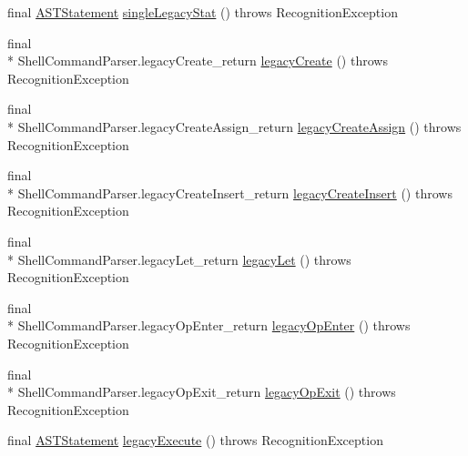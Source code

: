 \begin{DoxyCompactItemize}
\item 
final \hyperlink{classorg_1_1tzi_1_1use_1_1parser_1_1soil_1_1ast_1_1_a_s_t_statement}{A\-S\-T\-Statement} \hyperlink{classorg_1_1tzi_1_1use_1_1parser_1_1shell_1_1_shell_command_parser_a65e8d10fcc4ea150207c26709ffe4c95}{single\-Legacy\-Stat} ()  throws Recognition\-Exception 
\item 
final \\*
Shell\-Command\-Parser.\-legacy\-Create\-\_\-return \hyperlink{classorg_1_1tzi_1_1use_1_1parser_1_1shell_1_1_shell_command_parser_a84a4d3f3692cd30e19e023ea7d5605f6}{legacy\-Create} ()  throws Recognition\-Exception 
\item 
final \\*
Shell\-Command\-Parser.\-legacy\-Create\-Assign\-\_\-return \hyperlink{classorg_1_1tzi_1_1use_1_1parser_1_1shell_1_1_shell_command_parser_a4e6e4af3b8771a6697064099bbb9c935}{legacy\-Create\-Assign} ()  throws Recognition\-Exception 
\item 
final \\*
Shell\-Command\-Parser.\-legacy\-Create\-Insert\-\_\-return \hyperlink{classorg_1_1tzi_1_1use_1_1parser_1_1shell_1_1_shell_command_parser_a131c88b0991525525b04d6e87e8f32bd}{legacy\-Create\-Insert} ()  throws Recognition\-Exception 
\item 
final \\*
Shell\-Command\-Parser.\-legacy\-Let\-\_\-return \hyperlink{classorg_1_1tzi_1_1use_1_1parser_1_1shell_1_1_shell_command_parser_afc14307fde7022bf2e6824305033984b}{legacy\-Let} ()  throws Recognition\-Exception 
\item 
final \\*
Shell\-Command\-Parser.\-legacy\-Op\-Enter\-\_\-return \hyperlink{classorg_1_1tzi_1_1use_1_1parser_1_1shell_1_1_shell_command_parser_a9a3c0fda33b8fc9ff910bd02ae69484c}{legacy\-Op\-Enter} ()  throws Recognition\-Exception 
\item 
final \\*
Shell\-Command\-Parser.\-legacy\-Op\-Exit\-\_\-return \hyperlink{classorg_1_1tzi_1_1use_1_1parser_1_1shell_1_1_shell_command_parser_a11fbf4cb32ae7da41ab78d6526ba7e0c}{legacy\-Op\-Exit} ()  throws Recognition\-Exception 
\item 
final \hyperlink{classorg_1_1tzi_1_1use_1_1parser_1_1soil_1_1ast_1_1_a_s_t_statement}{A\-S\-T\-Statement} \hyperlink{classorg_1_1tzi_1_1use_1_1parser_1_1shell_1_1_shell_command_parser_a0e0822de2ad3b109a575db0f13d673de}{legacy\-Execute} ()  throws Recognition\-Exception 
\item 

\end{DoxyCompactItemize}
